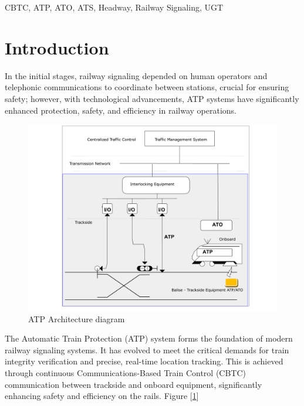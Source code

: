 \documentclass[conference]{IEEEtran}
\begin{document}
\begin{IEEEkeywords}
CBTC, ATP, ATO, ATS, Headway, Railway Signaling, UGT
\end{IEEEkeywords}


\section{Introduction}
In the initial stages, railway signaling depended on human operators and telephonic communications to coordinate between stations, crucial for ensuring safety; however, with technological advancements, ATP systems have significantly enhanced protection, safety, and efficiency in railway operations.

\begin{figure}[htbp]
    \centering
    \centerline{\includegraphics[scale=0.20, angle=0]{Imagenes_general/ATP_Architecture_Metro_Quito_1.pdf}}
    \caption{ATP Architecture diagram}
    \label{ATP Architecture diagram}
\end{figure}

The Automatic Train Protection (ATP) system forms the foundation of modern railway signaling systems. It has evolved to meet the critical demands for train integrity verification and precise, real-time location tracking. This is achieved through continuous Communications-Based Train Control (CBTC) communication between trackside and onboard equipment, significantly enhancing safety and efficiency on the rails. Figure [\ref{ATP Architecture diagram}]
\end{document}
